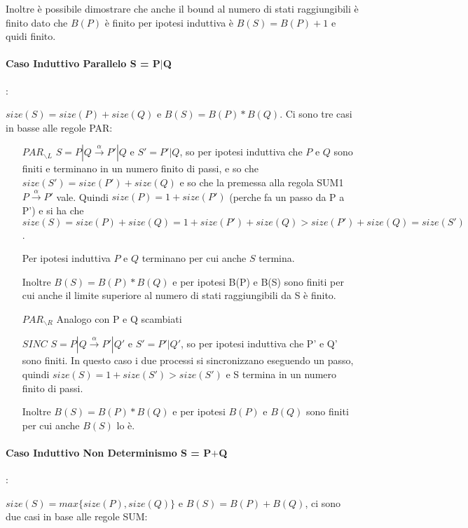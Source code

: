 \documentclass{article}
\begin{document}
Inoltre è possibile dimostrare che anche il bound al numero di stati raggiungibili è finito dato che $B(P)$ è finito per ipotesi induttiva è $B(S) = B(P)+1$ e quidi finito.

\paragraph{Caso Induttivo Parallelo S = P$|$Q}:

$size(S) = size(P) + size(Q) $ e $B(S) = B(P) * B(Q)$. Ci sono tre casi in basse alle regole PAR:
\begin{itemize}
    \item[$PAR_{\backslash L}$] $S = P|Q \xrightarrow{\alpha} P'|Q$ e $S'=P'|Q$, so per ipotesi induttiva che $P$ e $Q$ sono finiti e terminano in un numero finito di passi, e so che $size(S') = size(P') + size(Q) $ e so che la premessa alla regola SUM1  $P\xrightarrow{\alpha} P'$ vale. Quindi $size(P) = 1 + size(P')$ (perche fa un passo da P a P') e si ha che $size(S) = size(P) + size(Q) = 1+size(P') + size(Q) > size(P') + size(Q) = size(S')$. 
    
    Per ipotesi induttiva $P$ e $Q$ terminano per cui anche $S$ termina.
    
    Inoltre $B(S) = B(P)*B(Q)$  e per ipotesi B(P) e B(S) sono finiti per cui anche il limite superiore al numero di stati raggiungibili da S è finito.
    
     \item[$PAR_{\backslash R}$] Analogo con P e Q scambiati
     
     \item[$SINC$] $S = P|Q \xrightarrow{\alpha} P'|Q'$ e $S'=P'|Q'$, so per ipotesi induttiva che P' e Q' sono finiti. In questo caso i due processi si sincronizzano eseguendo un passo, quindi $size(S) = 1 + size(S') > size(S')$ e S termina in un numero finito di passi. 
     
     Inoltre $B(S) = B(P) * B(Q)$ e per ipotesi $B(P)$ e $B(Q)$ sono finiti per cui anche $B(S)$ lo è.
\end{itemize}

\paragraph{Caso Induttivo Non Determinismo S = P$+$Q}:

$size(S) = max\{size(P), size(Q)\}$ e $B(S) = B(P) + B(Q)$, ci sono due casi in base alle regole SUM:
\end{document}
